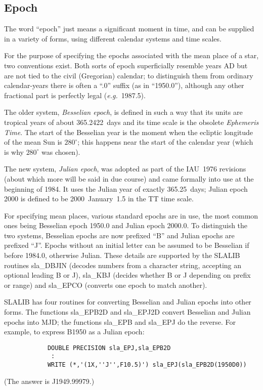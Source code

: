 \documentclass[11pt,twoside]{article}
\begin{document}
\subsection{Epoch}
The word ``epoch'' just means a significant
moment in time, and can be supplied
in a variety of forms, using different calendar systems and time scales.

For the purpose of specifying the epochs associated with the
mean place of a star, two conventions exist.  Both sorts of epoch
superficially resemble years AD but are not tied to the civil
(Gregorian) calendar;  to distinguish them from ordinary calendar-years
there is often
a ``.0'' suffix (as in ``1950.0''), although any other fractional
part is perfectly legal ({\it e.g.}\ 1987.5).

The older system,
{\it Besselian epoch}, is defined in such a way that its units are
tropical years of about 365.2422~days and its time scale is the
obsolete {\it Ephemeris Time}.
The start of the Besselian year is the moment
when the ecliptic longitude of the mean Sun is
$280^{\circ}$;  this happens near the start of the
calendar year (which is why $280^{\circ}$ was chosen).

The new system, {\it Julian epoch}, was adopted as
part of the IAU~1976 revisions (about which more will be said
in due course) and came formally into use at the
beginning of 1984.  It uses the Julian year of exactly
365.25~days; Julian epoch 2000 is defined to be 2000~January~1.5 in the
TT time scale.

For specifying mean places, various standard epochs are in use, the
most common ones being Besselian epoch 1950.0 and Julian epoch 2000.0.
To distinguish the two systems, Besselian epochs
are now prefixed ``B'' and Julian epochs are prefixed ``J''.
Epochs without an initial letter can be assumed to be Besselian
if before 1984.0, otherwise Julian.  These details are supported by
the SLALIB routines
sla\_DBJIN
(decodes numbers from a
character string, accepting an optional leading B or J),
sla\_KBJ
(decides whether B or J depending on prefix or range) and
sla\_EPCO
(converts one epoch to match another).

SLALIB has four routines for converting
Besselian and Julian epochs into other forms.
The functions
sla\_EPB2D
and
sla\_EPJ2D
convert Besselian and Julian epochs into MJD; the functions
sla\_EPB
and
sla\_EPJ
do the reverse.  For example, to express B1950 as a Julian epoch:
\goodbreak
\begin{verbatim}
            DOUBLE PRECISION sla_EPJ,sla_EPB2D
             :
            WRITE (*,'(1X,''J'',F10.5)') sla_EPJ(sla_EPB2D(1950D0))
\end{verbatim}
\goodbreak
(The answer is J1949.99979.)
\end{document}
